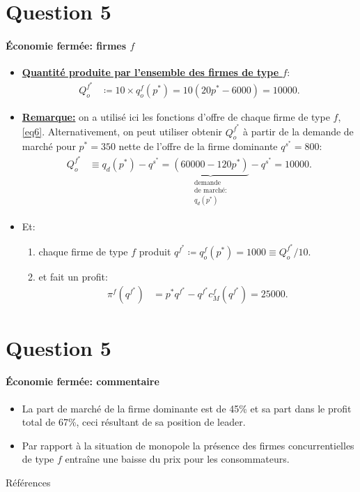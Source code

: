   \section{Question 5}
  \frame{\sectionpage}
  \begin{frame}[allowframebreaks]{\insertsection}
   \framesubtitle{Économie fermée: firmes $f$}
  \begin{itemize}
  \item \underline{\textbf{Quantité produite par l'ensemble des firmes de type $f$}}:
  \begin{align*}
  Q^{f^*}_o &\coloneqq 10\times q^f_o(p^*) = 10(20p^* - 6000) = 10000.
  \end{align*}
  \item \underline{\textbf{Remarque:}} on a utilisé ici les fonctions d'offre de chaque firme de type $f$, \eqref{eq6}. Alternativement, on peut utiliser
  obtenir $Q^{f^*}_o$ à partir de la demande de marché pour $p^* = 350$ nette de l'offre de la firme dominante $q^{s^*} = 800$:
  \begin{align*}
   Q^{f^*}_o &\equiv q_d(p^*) - q^{s^*}= \underbrace{(60000 - 120p^*)}_{\substack{\text{demande} \\ \text{de marché:} \\ q_d(p^*) }} - q^{s^*} = 10000.
  \end{align*}
  \item Et:
  \begin{enumerate}[$\cdot$]
  \item chaque firme de type $f$ produit $q^{f^*} \coloneqq q_o^f(p^*) = 1000 \equiv Q^{f^*}_o/10$.
  \item et fait un profit:
  \begin{align*}
  \pi^f(q^{f^*}) &= p^*q^{f^*} - q^{f^*} c_M^f(q^{f^*})  = 25000.
  \end{align*}
  \end{enumerate}
  \end{itemize}
  \end{frame}
  
   \section{Question 5}
  \frame{\sectionpage}
  \begin{frame}[allowframebreaks]{\insertsection}
   \framesubtitle{Économie fermée: commentaire}
  \begin{itemize}
  \item La part de marché de la firme dominante est de 45\% et sa part dans le profit total de 67\%, ceci résultant de sa position de leader.
  \item Par rapport à la situation de monopole la présence des firmes concurrentielles de type $f$ entraîne une baisse du prix pour les consommateurs.
    \end{itemize}
  \end{frame}
\begin{frame}[allowframebreaks]{Références}


\end{frame}


